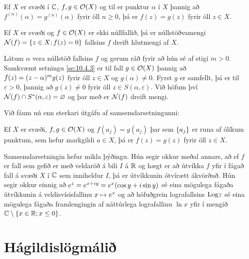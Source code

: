 \begin{se}  
Ef $X$ er svæði í ${\mathbb C}$, $f,g\in {\cal O}(X)$ og 
til er punktur ${\alpha}$ í $X$ þannig að
$f^{(n)}({\alpha})=g^{(n)}({\alpha})$ fyrir öll $n\geq 0$, 
þá er $f(z)=g(z)$ fyrir öll $z\in X$.  
\end{se}





\begin{se}
  Ef $X$ er svæði og $f\in {\cal O}(X)$ er ekki núllfallið, þá er
núllstöðvamengi ${\cal N}(f)={\{z\in X; f(z)=0\}}$ fallsins $f$ dreift hlutmengi af $X$.
\end{se}


\begin{so} Látum $\alpha$ vera núllstöð fallsins $f$ og gerum ráð fyrir að
hún sé af stigi $m>0$.  Samkvæmt setningu \ref{se:10.4.3} er til fall
$g\in {\cal O}(X)$ þannig að $f(z)=(z-\alpha)\sp mg(z)$ fyrir öll $z\in X$
og $g(\alpha)\neq 0$.  Fyrst $g$ er samfellt, þá er til
$\varepsilon>0$, þannig að $g(z)\neq 0$ fyrir öll $z\in
S(\alpha,\varepsilon)$.  Við höfum því ${\cal N}(f)\cap S\sp
*(\alpha,\varepsilon)=\varnothing$ og þar með er ${\cal N}(f)$ dreift
mengi. 
\end{so}

\medskip
Við fáum nú enn sterkari útgáfu af samsemdarsetningunni:

\begin{se}   
Ef $X$ er svæði, $f,g\in {\cal O}(X)$ og $f(a_j)=g(a_j)$ þar sem
${\{a_j\}}$ er runa af ólíkum punktum, sem hefur markgildi $a\in X$,
þá er $f(z)=g(z)$ fyrir öll $z\in X$.  
\end{se}

\medskip
Samsemdarsetningin hefur mikla þýðingu.  Hún segir okkur meðal
annars, að ef $f$ er fall sem gefið er með veldaröð á bili $I$ á ${\mathbb R}$
og hægt er að útvíkka $f$ yfir í fágað fall á svæði $X$ í ${\mathbb C}$ sem
inniheldur $I$, þá er útvíkkunin ótvírætt ákvörðuð.  
Hún segir okkur einnig að 
$e\sp z=e\sp{x+iy}=e\sp x(\cos y+i\sin y)$ sé eina mögulega fágaða
útvíkkunin á veldisvísisfallinu $x\mapsto e\sp x$ og að höfuðgrein
lografallsins ${\operatorname{Log}} z$ sé eina mögulega fágaða framlengingin af
náttúrlega lografallinu $\ln x$ yfir í mengið ${\mathbb C}\setminus{\{x\in
{\mathbb R}; x\leq 0\}}$.  



\section{Hágildislögmálið}

